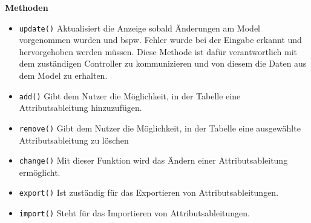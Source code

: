 \documentclass{article}
\begin{document}
\textbf{{Methoden}}
\begin{itemize}
\item \texttt{update()} \newline Aktualisiert die Anzeige sobald Änderungen am Model vorgenommen wurden und bspw. Fehler wurde bei der Eingabe erkannt und hervorgehoben werden müssen. Diese Methode ist dafür verantwortlich mit dem zuständigen Controller zu kommunizieren und von diesem die Daten aus dem Model zu erhalten.

\item \texttt{add()} \newline Gibt dem Nutzer die Möglichkeit, in der Tabelle eine Attributsableitung hinzuzufügen.

\item \texttt{remove()} \newline Gibt dem Nutzer die Möglichkeit, in der Tabelle eine ausgewählte Attributsableitung zu löschen

\item \texttt{change()} \newline Mit dieser Funktion wird das Ändern einer Attributsableitung ermöglicht.

\item \texttt{export()} \newline Ist zuständig für das Exportieren von Attributsableitungen.

\item \texttt{import()} \newline Steht für das Importieren von Attributsableitungen.
\end{itemize}
\end{document}
